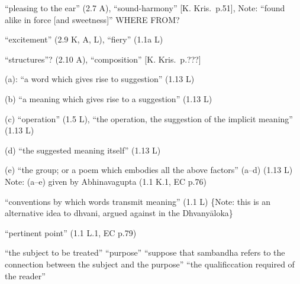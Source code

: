 \documentclass[10pt]{article}
\begin{document}
\begin{multicols}{2}
\begin{enumerate}[
			leftmargin=0em,
			rightmargin=0em,
		]
		 ``pleasing to the ear'' (2.7 A), ``sound-harmony'' [K. Kris.\ p.51], Note: ``found alike in force [and sweetness]'' WHERE FROM?

		 ``excitement'' (2.9 K, A, L), ``fiery'' (1.1a L)

		 ``structures''? (2.10 A), ``composition'' [K. Kris.\ p.???]



		 (a): ``a word which gives rise to suggestion'' (1.13 L)

		 (b) ``a meaning which gives rise to a suggestion'' (1.13 L)

		 (c) ``operation'' (1.5 L),
		``the operation, the suggestion of the implicit meaning'' (1.13 L)

		 (d) ``the suggested meaning itself'' (1.13 L)

		 (e) ``the group; or a poem which embodies all the above factors'' (a--d) (1.13 L) Note: (a--e) given by Abhinavagupta (1.1 K.1, EC p.76)

		  ``conventions by which words transmit meaning'' (1.1 L) \{Note: this is an alternative idea to dhvani, argued against in the Dhvanyāloka\}

		 ``pertinent point'' (1.1 L.1, EC p.79)
		\begin{enumerate}
			 ``the subject to be treated''
			 ``purpose''
			 ``suppose that sambandha refers to the connection between the subject and the purpose''
			 ``the qualificcation required of the reader''
		\end{enumerate}


\end{enumerate}
\end{multicols}
\end{document}
